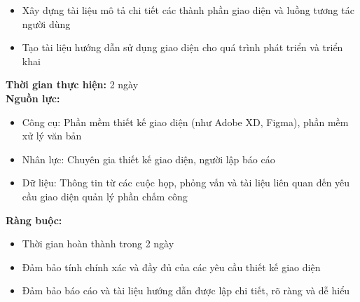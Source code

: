 {\begin{minipage}{\textwidth}
\begin{itemize}
        \item Xây dựng tài liệu mô tả chi tiết các thành phần giao diện và luồng tương tác người dùng
        \item Tạo tài liệu hướng dẫn sử dụng giao diện cho quá trình phát triển và triển khai
    \end{itemize}
    \noindent \textbf{Thời gian thực hiện:} 2 ngày \\
    \noindent \textbf{Nguồn lực:}
    \begin{itemize}
        \item Công cụ: Phần mềm thiết kế giao diện (như Adobe XD, Figma), phần mềm xử lý văn bản
        \item Nhân lực: Chuyên gia thiết kế giao diện, người lập báo cáo
        \item Dữ liệu: Thông tin từ các cuộc họp, phỏng vấn và tài liệu liên quan đến yêu cầu giao diện quản lý phần chấm công
    \end{itemize}
    \noindent \textbf{Ràng buộc:}
    \begin{itemize}
        \item Thời gian hoàn thành trong 2 ngày
        \item Đảm bảo tính chính xác và đầy đủ của các yêu cầu thiết kế giao diện
        \item Đảm bảo báo cáo và tài liệu hướng dẫn được lập chi tiết, rõ ràng và dễ hiểu
    \end{itemize}
    \end{minipage}
}
\newpage
{}    
